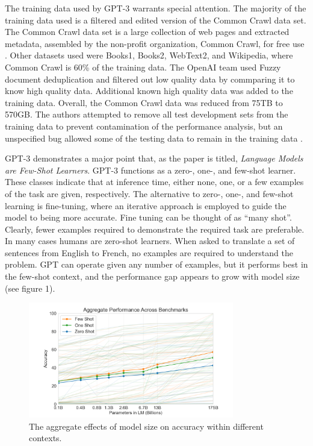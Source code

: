 \documentclass[12pt]{article}
\begin{document}
The training data used by GPT-3 warrants special attention. The majority of the
training data used is a filtered and edited version of the Common Crawl data
set. The Common Crawl data set is a large collection of web pages and extracted
metadata, assembled by the non-profit organization, Common Crawl, for free use
\cite{commoncrawl}. Other datasets used were Books1, Books2, WebText2, and Wikipedia,
where Common Crawl is 60\% of the training data. The OpenAI team used Fuzzy
document deduplication and filtered out low quality data by commparing it to
know high quality data. Additional known high quality data was added to the
training data. Overall, the Common Crawl data was reduced from 75TB to 570GB.
The authors attempted to remove all test development sets from the training
data to prevent contamination of the performance analysis, but an unspecified
bug allowed some of the testing data to remain in the training data
\cite{brown20}.

GPT-3 demonstrates a major point that, as the paper is titled, \textit{Language
Models are Few-Shot Learners}. GPT-3 functions as a zero-, one-, and few-shot
learner. These classes indicate that at inference time, either none, one, or a
few examples of the task are given, respectively. The alternative to zero-,
one-, and few-shot learning is fine-tuning, where an iterative approach is
employed to guide the model to being more accurate. Fine tuning can be thought
of as ``many shot''. Clearly, fewer examples required to demonstrate the
required task are preferable. In many cases humans are zero-shot learners. When
asked to translate a set of sentences from English to French, no examples are
required to understand the problem. GPT can operate given any number of
examples, but it performs best in the few-shot context, and the performance gap
appears to grow with model size (see figure 1). 

\begin{figure}[h]
	\centering
	\includegraphics[width=0.8\textwidth]{gpt-3-aggregate-tests.png}
	\caption{The aggregate effects of model size on accuracy within different 
			 contexts. \cite{brown20}}
\end{figure}
\end{document}
